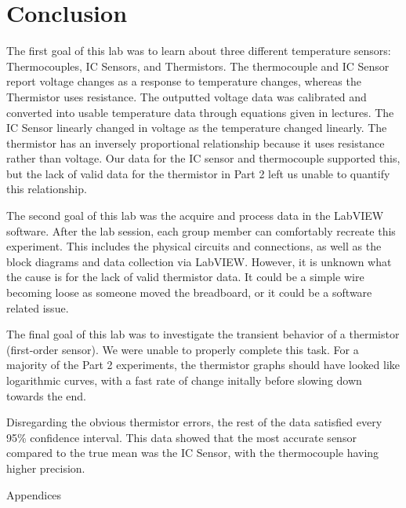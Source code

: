 \documentclass{article}
\begin{document}
\section{Conclusion}

The first goal of this lab was to learn about three different temperature sensors: Thermocouples, IC Sensors, and Thermistors.  The thermocouple and IC Sensor report voltage changes as a response to temperature changes, whereas the Thermistor uses resistance.  The outputted voltage data was calibrated and converted into usable temperature data through equations given in lectures.  The IC Sensor linearly changed in voltage as the temperature changed linearly.  The thermistor has an inversely proportional relationship because it uses resistance rather than voltage.  Our data for the IC sensor and thermocouple supported this, but the lack of valid data for the thermistor in Part 2 left us unable to quantify this relationship.  

The second goal of this lab was the acquire and process data in the LabVIEW software.  After the lab session, each group member can comfortably recreate this experiment.  This includes the physical circuits and connections, as well as the block diagrams and data collection via LabVIEW.  However, it is unknown what the cause is for the lack of valid thermistor data.  It could be a simple wire becoming loose as someone moved the breadboard, or it could be a software related issue.  

The final goal of this lab was to investigate the transient behavior of a thermistor (first-order sensor).  We were unable to properly complete this task.  For a majority of the Part 2 experiments, the thermistor graphs should have looked like logarithmic curves, with a fast rate of change initally before slowing down towards the end.  \

Disregarding the obvious thermistor errors, the rest of the data satisfied every 95\% confidence interval.  This data showed that the most accurate sensor compared to the true mean was the IC Sensor, with the thermocouple having higher precision.


\newpage
\thispagestyle{empty}  %
\begin{center}
	\vspace*{\fill}
	{\Huge Appendices}
	\vspace*{\fill}
\end{center}
\end{document}
